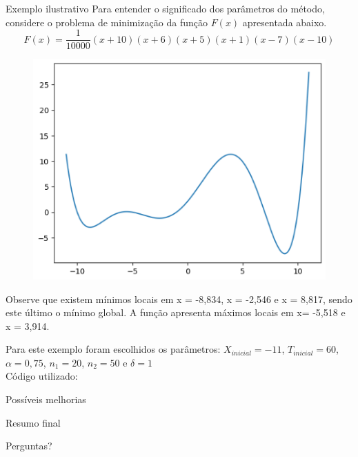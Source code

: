 \documentclass{beamer}
\begin{document}
\begin{frame}{Exemplo ilustrativo}
    Para entender o significado dos parâmetros do método, considere o problema de
minimização da função $F(x)$ apresentada abaixo.
    \begin{equation}
        F(x) = \frac{1}{10000}(x+10)(x+6)(x+5)(x+1)(x-7)(x-10)
    \end{equation}
    \begin{figure}
        \includegraphics[scale = 0.35]{src/PontoOtimo2.png}
    \end{figure}

Observe que existem mínimos locais em x = -8,834, x = -2,546 e x = 8,817, sendo este
último o mínimo global. A função apresenta máximos locais em x= -5,518 e x = 3,914.
\end{frame}

\begin{frame}
    Para este exemplo foram escolhidos os parâmetros: $X_{inicial} = -11$, $T_{inicial} = 60$, $\alpha = 0,75$, $n_1 = 20$, $n_2 = 50$ e $\delta = 1$\\
    Código utilizado:
    
\end{frame}

\begin{frame}{Possíveis melhorias}
    
\end{frame}

\begin{frame}{Resumo final}
    
\end{frame}

\begin{frame}
    \begin{center}
        \centering
        \Large{Perguntas?}
    \end{center}
\end{frame}
\end{document}

